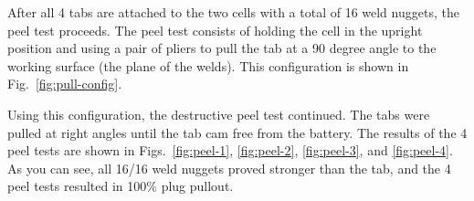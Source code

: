 \documentclass{article}
\begin{document}
After all 4 tabs are attached to the two cells with a total of 16 weld nuggets, the peel test proceeds. The peel test consists of holding the cell in the upright position and using a pair of pliers to pull the tab at a 90 degree angle to the working surface (the plane of the welds). This configuration is shown in Fig.~\ref{fig:pull-config}.




Using this configuration, the destructive peel test continued. The tabs were pulled at right angles until the tab cam free from the battery. The results of the 4 peel tests are shown in Figs.~\ref{fig:peel-1}, \ref{fig:peel-2}, \ref{fig:peel-3}, and \ref{fig:peel-4}. As you can see, all 16/16 weld nuggets proved stronger than the tab, and the 4 peel tests resulted in 100\% plug pullout. 
\end{document}
